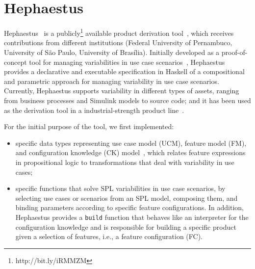 \section{Hephaestus}\label{sec:hephaestus}

Hephaestus~\cite{rbonifacio:sbcars2009} is a publicly\footnote{http://bit.ly/iRMMZM} available product derivation
tool~\cite{deelstra:2005}, which receives contributions from different
institutions (Federal University of Pernambuco, University of S\~{a}o
Paulo, University of Bras\'{i}lia).  Initially developed as a proof-of-concept tool for managing
variabilities in use case scenarios~\cite{rbonifacio:aosd2009}, Hephaestus
provides a declarative and executable specification in Haskell of  a compositional~\cite{kastner:2008} and parametric approach
for managing variability in use case scenarios.
Currently, Hephaestus supports variability in different types of assets, ranging
from business processes and Simulink models to source code; and
it has been used as the derivation tool in a industrial-strength product line~\cite{ferreira:2010}.

For the initial purpose of the tool, we first implemented:

\begin{itemize}
\item specific data types representing use case model (UCM), feature model (FM), and configuration knowledge (CK) model~\cite{gpbook},
  which relates feature expressions in propositional logic to transformations that
 deal with variability in use cases;

\item specific functions that solve SPL variabilities in use case scenarios, by selecting use cases or scenarios
  from an SPL model, composing them, and binding parameters according to specific
  feature configurations. In addition, Hephaestus
  provides a \texttt{build} function that behaves like an interpreter
  for the configuration knowledge and is responsible for building a
  specific product given a selection of features, i.e., a feature configuration (FC).

\end{itemize}


